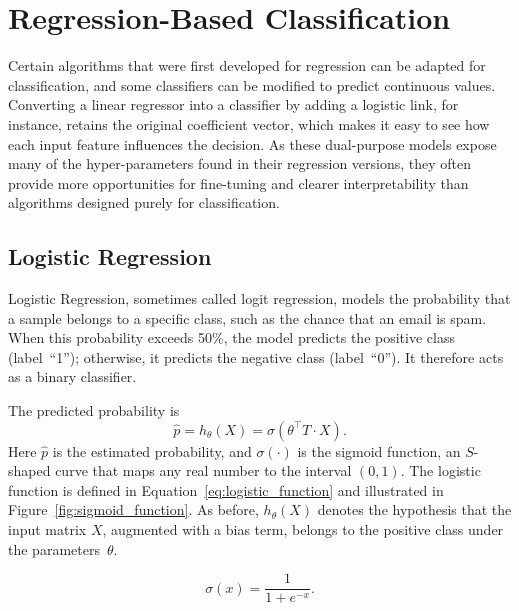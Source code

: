 \documentclass[12pt,letter]{article}
\begin{document}
	\setcounter{section}{4}	
	\setcounter{figure}{0}   
	\renewcommand\thefigure{\thesection.\arabic{figure}}
	\setcounter{equation}{0}   
	\renewcommand\theequation{\thesection.\arabic{equation}}

\section{Regression-Based Classification}

Certain algorithms that were first developed for regression can be adapted for classification, and some classifiers can be modified to predict continuous values. Converting a linear regressor into a classifier by adding a logistic link, for instance, retains the original coefficient vector, which makes it easy to see how each input feature influences the decision. As these dual-purpose models expose many of the hyper-parameters found in their regression versions, they often provide more opportunities for fine-tuning and clearer interpretability than algorithms designed purely for classification.

\subsection{Logistic Regression}


Logistic Regression, sometimes called logit regression, models the probability that a sample belongs to a specific class, such as the chance that an email is spam. When this probability exceeds 50\%, the model predicts the positive class (label~``1''); otherwise, it predicts the negative class (label~``0''). It therefore acts as a binary classifier.


The predicted probability is
\begin{equation}
    \hat{p} = h_\theta(X) = \sigma(\theta^{\top}{T} \cdot X).
\end{equation}
Here $\hat{p}$ is the estimated probability, and $\sigma(\cdot)$ is the sigmoid function, an $S$-shaped curve that maps any real number to the interval $(0,1)$. The logistic function is defined in Equation~\ref{eq:logistic_function} and illustrated in Figure~\ref{fig:sigmoid_function}. As before, $h_\theta(X)$ denotes the hypothesis that the input matrix $X$, augmented with a bias term, belongs to the positive class under the parameters~$\theta$.


\begin{equation}
    \sigma(x) = \frac{1}{1 + e^{-x} }.
    \label{eq:logistic_function}
\end{equation}
\end{document}
